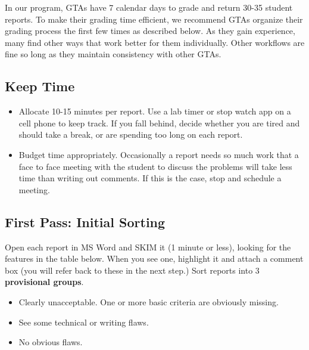 \documentclass[
]{book}
\providecommand{\tightlist}{%
  \setlength{\itemsep}{0pt}\setlength{\parskip}{0pt}}
\begin{document}
In our program, GTAs have 7 calendar days to grade and return 30-35 student reports. To make their grading time efficient, we recommend GTAs organize their grading process the first few times as described below. As they gain experience, many find other ways that work better for them individually. Other workflows are fine so long as they maintain consistency with other GTAs.

\hypertarget{keep-time}{%
\subsection*{Keep Time}\label{keep-time}}

\begin{itemize}
\tightlist
\item
  Allocate 10-15 minutes per report. Use a lab timer or stop watch app on a cell phone to keep track. If you fall behind, decide whether you are tired and should take a break, or are spending too long on each report.
\item
  Budget time appropriately. Occasionally a report needs so much work that a face to face meeting with the student to discuss the problems will take less time than writing out comments. If this is the case, stop and schedule a meeting.
\end{itemize}

\hypertarget{first-pass-initial-sorting}{%
\subsection*{First Pass: Initial Sorting}\label{first-pass-initial-sorting}}

Open each report in MS Word and SKIM it (1 minute or less), looking for the features in the table below. When you see one, highlight it and attach a comment box (you will refer back to these in the next step.) Sort reports into 3 \textbf{provisional groups}.

\begin{itemize}
\tightlist
\item
  Clearly unacceptable. One or more basic criteria are obviously missing.
\item
  See some technical or writing flaws.
\item
  No obvious flaws.
\end{itemize}
\end{document}
